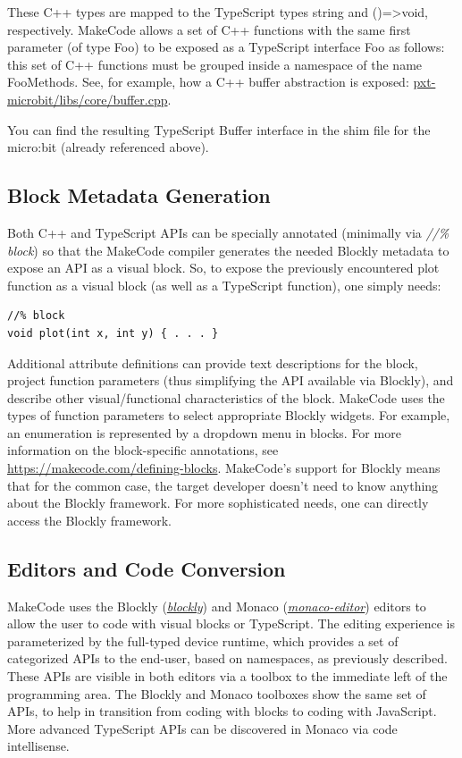 These C++ types are mapped to the TypeScript types string and ()=>void, respectively.
MakeCode allows a set of C++ functions with the same first parameter (of type Foo) to be
exposed as a TypeScript interface Foo as follows: this set of C++ functions must be grouped
inside a namespace of the name FooMethods.  See, for example, how a C++ buffer abstraction is exposed:
\href{https://github.com/Microsoft/pxt-microbit/blob/master/libs/core/buffer.cpp}{pxt-microbit/libs/core/buffer.cpp}.

You can find the resulting TypeScript Buffer interface in the shim file for the micro:bit
(already referenced above). 

\subsection{Block Metadata Generation}

Both C++ and TypeScript APIs can be specially annotated (minimally via 
\emph{//\% block}) so that the MakeCode compiler generates the needed
Blockly metadata to expose an API as a visual block. So, to expose the previously
encountered plot function as a visual block (as well as a TypeScript function), one simply needs:
\begin{lstlisting}
//% block
void plot(int x, int y) { . . . }
\end{lstlisting}

Additional attribute definitions can provide text descriptions for the block, project function
parameters (thus simplifying the API available via Blockly), and describe other visual/functional
characteristics of the block.  MakeCode uses the types of function parameters to select appropriate
Blockly widgets.  For example, an enumeration is represented by a dropdown menu in blocks.
For more information on the block-specific annotations, see 
\url{https://makecode.com/defining-blocks}. 
MakeCode's support for Blockly means that for the common case, the target developer doesn't need
to know anything about the Blockly framework.  For more sophisticated needs, one can directly access
the Blockly framework. 

\subsection{Editors and Code Conversion}

MakeCode uses the Blockly (\emph{\href{https://github.com/google/blockly}{blockly}}) and Monaco 
(\emph{\href{https://github.com/Microsoft/monaco-editor}{monaco-editor}}) editors to allow the user to code with
visual blocks or TypeScript. The editing experience is parameterized by the full-typed device
runtime, which provides a set of categorized APIs to the end-user, based on namespaces, as
previously described. These APIs are visible in both editors via a toolbox to the immediate
left of the programming area. The Blockly and Monaco toolboxes show the same set of APIs, to
help in transition from coding with blocks to coding with JavaScript. More advanced TypeScript
APIs can be discovered in Monaco via code intellisense.

